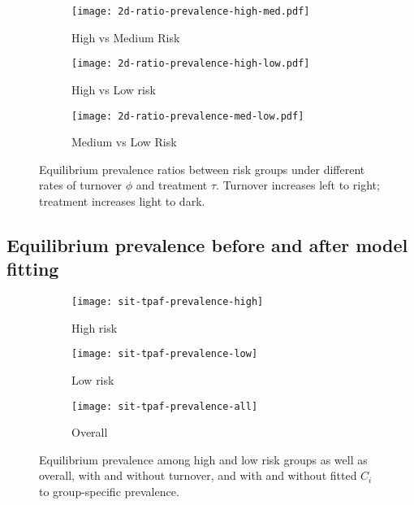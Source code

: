 \begin{figure}[H]
  \centering
  \begin{subfigure}{0.31\linewidth}
    \centering\texttt{[image: 2d-ratio-prevalence-high-med.pdf]}
    \caption{High vs Medium Risk}
    \label{fig:2d-ratio-prevalence-high-med}
  \end{subfigure}
  \begin{subfigure}{0.31\linewidth}
    \centering\texttt{[image: 2d-ratio-prevalence-high-low.pdf]}
    \caption{High vs Low risk}
    \label{fig:2d-ratio-prevalence-high-low}
  \end{subfigure}
  \begin{subfigure}{0.31\linewidth}
    \centering\texttt{[image: 2d-ratio-prevalence-med-low.pdf]}
    \caption{Medium vs Low Risk}
    \label{fig:2d-ratio-prevalence-med-low}
  \end{subfigure}
  \caption{Equilibrium prevalence ratios between risk groups
    under different rates of turnover $\phi$ and treatment $\tau$.
    Turnover increases left to right;
    treatment increases light to dark.}
  \label{fig:2d-ratio-prevalence}
\end{figure}
\subsection{Equilibrium prevalence before and after model fitting}
\begin{figure}[H]
  \centering
  \begin{subfigure}{0.31\linewidth}
    \centering\texttt{[image: sit-tpaf-prevalence-high]}
    \caption{High risk}
    \label{fig:tpaf-prevalence-high}
  \end{subfigure}
  \begin{subfigure}{0.31\linewidth}
    \centering\texttt{[image: sit-tpaf-prevalence-low]}
    \caption{Low risk}
    \label{fig:tpaf-prevalence-low}
  \end{subfigure}
  \begin{subfigure}{0.31\linewidth}
    \centering\texttt{[image: sit-tpaf-prevalence-all]}
    \caption{Overall}
    \label{fig:tpaf-prevalence-all}
  \end{subfigure}
  \caption{Equilibrium prevalence among high and low risk groups as well as overall,
    with and without turnover,
    and with and without fitted $C_i$ to group-specific prevalence.}
  \label{fig:tpaf-prevalence}
\end{figure}
